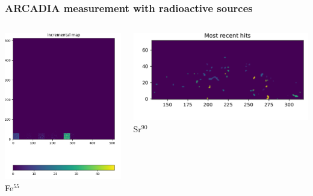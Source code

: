     \begin{frame}[noframenumbering]
        \frametitle{ARCADIA measurement with radioactive sources}
        \begin{columns}
                \includegraphics[width=.8\linewidth]{figures/charaterization/ARCADIA/Fe55_5min30s.png} \\
                \centering Fe$^{55}$
                
                \includegraphics[width=1.\linewidth]{figures/charaterization/ARCADIA/Sr90_2min.pdf}\\
                \centering Sr$^{90}$
        \end{columns}
    \end{frame}